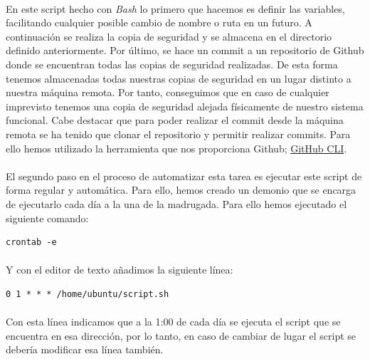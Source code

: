 \paragraph{}
En este script hecho con \textit{Bash} lo primero que hacemos es definir las variables, facilitando cualquier posible cambio de nombre o ruta en un futuro. A continuación se realiza la copia de seguridad y se almacena en el directorio definido anteriormente. Por último, se hace un commit a un repositorio de Github donde se encuentran todas las copias de seguridad realizadas. De esta forma tenemos almacenadas todas nuestras copias de seguridad en un lugar distinto a nuestra máquina remota. Por tanto, conseguimos que en caso de cualquier imprevisto tenemos una copia de seguridad alejada físicamente de nuestro sistema funcional. Cabe destacar que para poder realizar el commit desde la máquina remota se ha tenido que clonar el repositorio y permitir realizar commits. Para ello hemos utilizado la herramienta que nos proporciona Github; \href{https://docs.github.com/es/github-cli/github-cli/quickstart}{GitHub CLI}. 
\paragraph{}
El segundo paso en el proceso de automatizar esta tarea es ejecutar este script de forma regular y automática. Para ello, hemos creado un demonio que se encarga de ejecutarlo cada día a la una de la madrugada. Para ello hemos ejecutado el siguiente comando:
\begin{lstlisting}[frame=single, basicstyle=\tiny]
crontab -e
\end{lstlisting}
\paragraph{}
Y con el editor de texto añadimos la siguiente línea:
\begin{lstlisting}[frame=single, basicstyle=\tiny]
0 1 * * * /home/ubuntu/script.sh
\end{lstlisting}
\paragraph{}
Con esta línea indicamos que a la 1:00 de cada día se ejecuta el script que se encuentra en esa dirección, por lo tanto, en caso de cambiar de lugar el script se debería modificar esa línea también.

